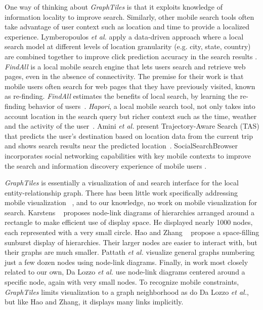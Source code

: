 One way of thinking about \textit{GraphTiles} is that it exploits knowledge of information locality to improve search. Similarly, other mobile search tools often take advantage of user context such as location and time to provide a localized experience. Lymberopoulos \textit{et al.} apply a data-driven approach where a local search model at different levels of location granularity (e.g. city, state, country) are combined together to improve click prediction accuracy in the search results \cite{Lymberopoulos:2011}. \textit{FindAll} is a local mobile search engine that lets users search and retrieve web pages, even in the absence of connectivity. The premise for their work is that mobile users often search for web pages that they have previously visited, known as re-finding. \textit{FindAll} estimates the benefits of local search, by learning the re-finding behavior of users~\cite{Balasubramanian:2012}. \textit{Hapori}, a local mobile search tool,  not only takes into account location in the search query but richer context such as the time, weather and the activity of the user~\cite{Lane:2010}. Amini \textit{et al.} present Trajectory-Aware Search (TAS) that predicts the user's destination based on location data from the current trip and shows search results near the predicted location~\cite{Amini:2012}. SocialSearchBrowser incorporates social networking capabilities with key mobile contexts to improve the search and information discovery experience of mobile users \cite{Church:2010}.

\textit{GraphTiles} is essentially a visualization of and search interface for the local entity-relationship graph. There has been little work specifically addressing mobile visualization ~\cite{RefWorks:658}, and to our knowledge, no work on mobile visualization for search. Karstens ~\cite{RefWorks:908} proposes node-link diagrams of hierarchies arranged around a rectangle to make efficient use of display space. He displayed nearly 1000 nodes, each represented with a very small circle. Hao and Zhang ~\cite{RefWorks:906} propose a space-filling sunburst display of hierarchies. Their larger nodes are easier to interact with, but their graphs are much smaller. Pattath \textit{et al.}  \cite{RefWorks:896} visualize general graphs numbering just a few dozen nodes using node-link diagrams. Finally, in work most closely related to our own, Da Lozzo \textit{et al.}\cite{springerlink:10.1007/978-3-642-18469-7-14} use node-link diagrams centered around a specific node, again with very small nodes. To recognize mobile constraints, \textit{GraphTiles} limits visualization to a graph neighborhood as do Da Lozzo \textit{et al.}, but like Hao and Zhang, it displays many links implicitly.